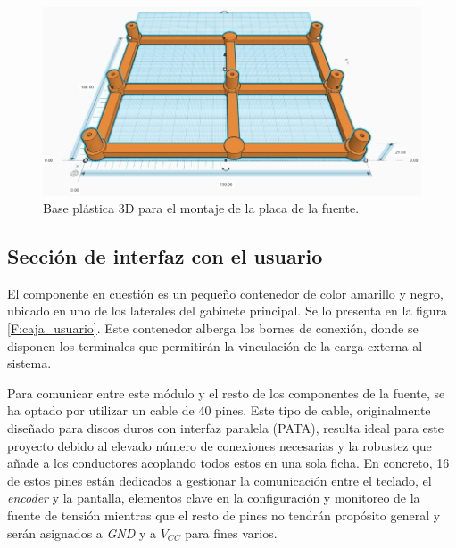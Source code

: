 \begin{figure}[H]
    \centering
    \includegraphics[scale=0.4]{./imagenes/3d_base.jpg}
    \caption{Base plástica 3D para el montaje de la placa de la fuente.}
    \label{F:base3d_fuente}
\end{figure}

\subsection{Sección de interfaz con el usuario}
El componente en cuestión es un pequeño contenedor de color amarillo y negro, ubicado en uno de los laterales del gabinete principal. Se lo presenta en la figura \ref{F:caja_usuario}. Este contenedor alberga los bornes de conexión, donde se disponen los terminales que permitirán la vinculación de la carga externa al sistema. \par
Para comunicar entre este módulo y el resto de los componentes de la fuente, se ha optado por utilizar un cable de 40 pines. Este tipo de cable, originalmente diseñado para discos duros con interfaz paralela (PATA), resulta ideal para este proyecto debido al elevado número de conexiones necesarias y la robustez que añade a los conductores acoplando todos estos en una sola ficha. En concreto, 16 de estos pines están dedicados a gestionar la comunicación entre el teclado, el \textit{encoder} y la pantalla, elementos clave en la configuración y monitoreo de la fuente de tensión mientras que el resto de pines no tendrán propósito general y serán asignados a \textit{GND} y a \textit{$V_{CC}$} para fines varios. \par

